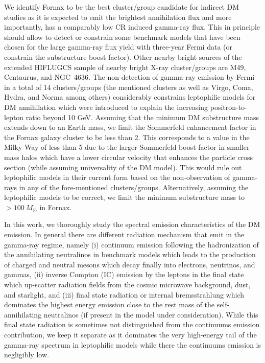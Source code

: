 \documentclass[10pt,aps,pra,reprint,amsmath,amsfonts,amssymb,showpacs,nofootinbib,floatfix]{revtex4-1}
\newcommand{\msun}{M_\odot}
\begin{document}
We identify Fornax to be the best cluster/group candidate for indirect
DM studies as it is expected to emit the brightest annihilation flux
and more importantly, has a comparably low CR induced gamma-ray flux.
This in principle should allow to detect or constrain some benchmark
models that have been chosen for the large gamma-ray flux yield with
three-year Fermi data (or constrain the substructure boost
factor). Other nearby bright sources of the extended HIFLUGCS sample
of nearby bright X-ray cluster/groups are M49, Centaurus, and
NGC~4636.  The non-detection of gamma-ray emission by Fermi in a total
of 14 clusters/groups (the mentioned clusters as well as Virgo, Coma,
Hydra, and Norma among others) considerably constrains leptophilic
models for DM annihilation which were introduced to explain the
increasing positron-to-lepton ratio beyond 10 GeV. Assuming that the
minimum DM substructure mass extends down to an Earth mass, we limit
the Sommerfeld enhancement factor in the Fornax galaxy cluster to be
less than 2. This corresponds to a value in the Milky Way of less than
5 due to the larger Sommerfeld boost factor in smaller mass halos
which have a lower circular velocity that enhances the particle cross
section (while assuming universality of the DM model). This would rule
out leptophilic models in their current form based on the
non-observation of gamma-rays in any of the fore-mentioned
clusters/groups. Alternatively, assuming the leptophilic models to be
correct, we limit the minimum substructure mass to $>100~\msun$ in
Fornax.

In this work, we thoroughly study the spectral emission
characteristics of the DM emission. In general there are different
radiation mechanism that emit in the gamma-ray regime, namely (i)
continuum emission following the hadronization of the annihilating
neutralinos in benchmark models which leads to the production of
charged and neutral mesons which decay finally into electrons,
neutrinos, and gammas, (ii) inverse Compton (IC) emission by the
leptons in the final state which up-scatter radiation fields from the
cosmic microwave background, dust, and starlight, and (iii) final
state radiation or internal bremsstrahlung which dominates the highest
energy emission close to the rest mass of the self-annihilating
neutralinos (if present in the model under consideration). While this
final state radiation is sometimes not distinguished from the
continuums emission contribution, we keep it separate as it dominates
the very high-energy tail of the gamma-ray spectrum in leptophilic
models while there the continuums emission is negligibly low.
\end{document}
